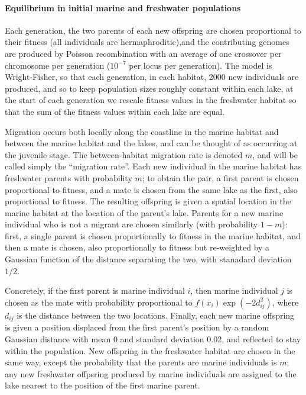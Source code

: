 \documentclass{article}
\begin{document}
\paragraph{Equilibrium in initial marine and freshwater populations} Each generation, the two parents of each new offspring are chosen proportional to their fitness (all individuals are hermaphroditic),and the contributing genomes are produced by Poisson recombination with an average of one crossover per chromosome per generation ($10^{-7}$ per locus per generation). The model is Wright-Fisher, so that each generation, in each habitat, 2000 new individuals are produced, and so to keep population sizes roughly constant within each lake, at the start of each generation we rescale fitness values in the freshwater habitat so that the sum of the fitness values within each lake are equal.

Migration occurs both locally along the coastline in the marine habitat and between the marine habitat and the lakes, and can be thought of as occurring at the juvenile stage. The between-habitat migration rate is denoted $m$, and will be called simply the ``migration rate''. Each new individual in the marine habitat has freshwater parents with probability $m$; to obtain the pair, a first parent is chosen proportional to fitness, and a mate is chosen from the same lake as the first, also proportional to fitness. The resulting offspring is given a spatial location in the marine habitat at the location of the parent's lake. Parents for a new marine individual who is not a migrant are chosen similarly (with probability $1-m$): first, a single parent is chosen proportionally to fitness in the marine habitat,
and then a mate is chosen,  also proportionally to fitness but re-weighted by a Gaussian function of the distance separating the two, with stanadard deviation $1/2$. 

Concretely, if the first parent is marine individual $i$, then marine individual $j$ is chosen as the mate with probability proportional to $f(x_i) \exp(-2d_{ij}^2)$,
where $d_{ij}$ is the distance between the two locations. Finally, each new marine offspring is given a position displaced from the first parent's position by a random Gaussian distance with mean 0 and standard deviation 0.02, and reflected to stay within the population. New offspring in the freshwater habitat are chosen in the same way, except the probability that the parents are marine individuals is $m$; any new freshwater offpsring produced by marine individuals are assigned to the lake nearest to the position of the first marine parent.
\end{document}
